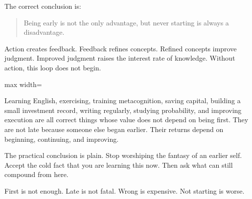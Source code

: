The correct conclusion is:

\begin{quote}
Being early is not the only advantage, but never starting is always a disadvantage.
\end{quote}

Action creates feedback. Feedback refines concepts. Refined concepts improve judgment. Improved judgment raises the interest rate of knowledge. Without action, this loop does not begin.

\begin{center}
\begin{adjustbox}{max width=\linewidth}
\end{adjustbox}
\end{center}

Learning English, exercising, training metacognition, saving capital, building a small investment record, writing regularly, studying probability, and improving execution are all correct things whose value does not depend on being first. They are not late because someone else began earlier. Their returns depend on beginning, continuing, and improving.

The practical conclusion is plain. Stop worshiping the fantasy of an earlier self. Accept the cold fact that you are learning this now. Then ask what can still compound from here.

First is not enough. Late is not fatal. Wrong is expensive. Not starting is worse.
